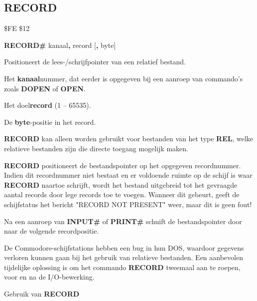 
\newpage
\subsection{RECORD}
\begin{description}[leftmargin=2cm,style=nextline]
\item [Token:]    \$FE \$12

\item [Formaat:]   {\bf RECORD\#} kanaal{\bf,} record [{\bf,} byte]

\item [Gebruik:]    Positioneert de lees-/schrijfpointer van een relatief bestand.

                  Het {\bf kanaal}nummer, dat eerder is opgegeven bij een aanroep van commando's zoals {\bf DOPEN} of {\bf OPEN}.

                  Het doel{\bf record} (1 -- 65535).

                  De {\bf byte}-positie in het record.

                  {\bf RECORD} kan alleen worden gebruikt voor bestanden van het type {\bf REL}, welke relatieve bestanden zijn die directe toegang mogelijk maken.

                  {\bf RECORD} positioneert de bestandspointer op het opgegeven recordnummer. Indien dit recordnummer niet bestaat en er voldoende ruimte op de schijf is waar {\bf RECORD} naartoe schrijft, wordt het bestand uitgebreid tot het gevraagde aantal records door lege records toe te voegen. Wanneer dit gebeurt, geeft de schijfstatus het bericht "RECORD NOT PRESENT" weer, maar dit is geen fout!

                  Na een aanroep van {\bf INPUT\#} of {\bf PRINT\#} schuift de bestandspointer door naar de volgende recordpositie.

\item [Opmerkingen:]  De Commodore-schijfstations hebben een bug in hun DOS, waardoor gegevens verloren kunnen gaan bij het gebruik van relatieve bestanden. Een aanbevolen tijdelijke oplossing is om het commando {\bf RECORD} tweemaal aan te roepen, voor en na de I/O-bewerking.

\item [Voorbeeld:] Gebruik van {\bf RECORD}


\end{description}
